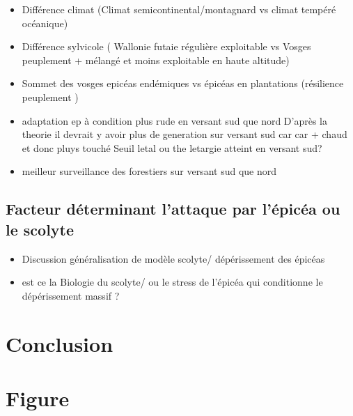 \documentclass[3p,procedia]{elsarticle}
\begin{document}
\begin{itemize}
	\item Différence climat (Climat semicontinental/montagnard vs climat tempéré océanique)
	\item Différence sylvicole ( Wallonie futaie régulière exploitable vs Vosges peuplement + mélangé et moins exploitable en haute altitude)
	\item Sommet des vosges epicéas endémiques vs épicéas en plantations (résilience peuplement )
	\item adaptation ep à condition plus rude en versant sud que nord 
	D'après la theorie il devrait y avoir plus de generation sur versant sud car car + chaud et donc pluys touché
	Seuil letal ou the letargie atteint en versant sud?
\item meilleur surveillance des forestiers sur versant sud que nord 
	
\end{itemize}

\subsection{Facteur déterminant l'attaque par l'épicéa ou le scolyte}

\begin{itemize}
	\item Discussion généralisation de modèle scolyte/ dépérissement des épicéas
    \item est ce la Biologie du scolyte/ ou le stress de l'épicéa qui conditionne le dépérissement massif ?
	
\end{itemize}

\section{Conclusion}

\section{Figure}


	

\end{document}
